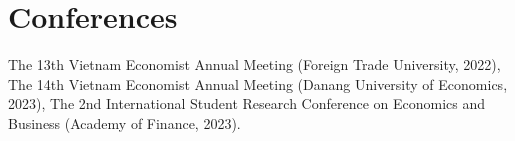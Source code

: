 \newcommand{\playsymbol}{$\blacktriangleright$}

\section{\sc Conferences}
The 13th Vietnam Economist Annual Meeting (Foreign Trade University, 2022), 
The 14th Vietnam Economist Annual Meeting (Danang University of Economics, 2023), The 2nd International Student Research Conference on Economics and Business (Academy of Finance, 2023).


